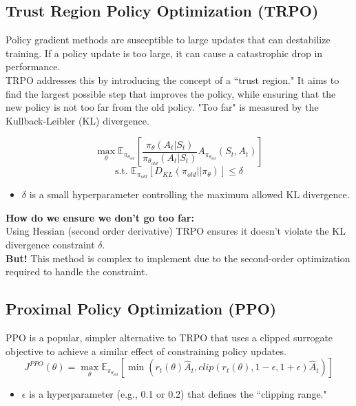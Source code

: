 \documentclass[12pt]{article}
\begin{document}
\subsection{Trust Region Policy Optimization (TRPO)}
Policy gradient methods are susceptible to large updates that can destabilize training. If a policy update is too large, it can cause a catastrophic drop in performance. \\

TRPO addresses this by introducing the concept of a ``trust region." It aims to find the largest possible step that improves the policy, while ensuring that the new policy is not too far from the old policy. "Too far" is measured by the Kullback-Leibler (KL) divergence.

$$ \max_\theta \mathbb{E}_{\pi_{\theta_{old}}} \left[ \frac{\pi_\theta(A_t|S_t)}{\pi_{\theta_{old}}(A_t|S_t)} A_{\pi_{\theta_{old}}}(S_t, A_t) \right] $$
$$ \text{s.t. } \mathbb{E}_{\pi_{old}} [D_{KL}(\pi_{old} || \pi_\theta)] \leq \delta $$

\begin{itemize}
    \item $\delta$ is a small hyperparameter controlling the maximum allowed KL divergence.
\end{itemize}

\textbf{How do we ensure we don't go too far:} \\ 
Using Hessian (second order derivative) TRPO ensures it doesn't violate the KL divergence constraint $\delta$. \\

\textbf{But!} This method is complex to implement due to the second-order optimization required to handle the constraint.

\subsection{Proximal Policy Optimization (PPO)}
PPO is a popular, simpler alternative to TRPO that uses a clipped surrogate objective to achieve a similar effect of constraining policy updates.
$$ J^{PPO} (\theta) =  \max_\theta \mathbb{E}_{\pi_{\theta_{old}}} \left[ \min\left( r_t(\theta) \hat{A}_t, clip(r_t(\theta), 1 - \epsilon, 1 + \epsilon) \hat{A}_t \right) \right] $$
\begin{itemize}
    \item $\epsilon$ is a hyperparameter (e.g., 0.1 or 0.2) that defines the ``clipping range."
\end{itemize}
\end{document}
